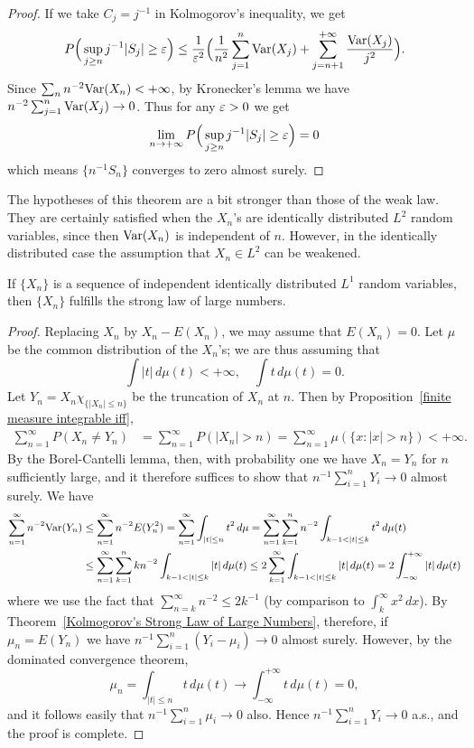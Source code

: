 \begin{proof}
If we take $C_j=j^{-1}$ in Kolmogorov's inequality, we get
\[P\Big(\sup_{j\geq n}j^{-1}|S_j|\geq\varepsilon\Big)\leq\frac{1}{\varepsilon^2}\Big(\frac{1}{n^2}\sum_{j=1}^{n}\mathrm{Var}(X_j)+\sum_{j=n+1}^{+\infty}\frac{\mathrm{Var}(X_j)}{j^2}\Big).\]
Since $\sum_nn^{-2}\mathrm{Var}(X_n)<+\infty$, by Kronecker's lemma we have $n^{-2}\sum_{j=1}^{n}\mathrm{Var}(X_j)\to 0$. Thus for any $\varepsilon>0$ we get
\[\lim_{n\to+\infty}P\Big(\sup_{j\geq n}j^{-1}|S_j|\geq\varepsilon\Big)=0\]
which means $\{n^{-1}S_n\}$ converges to zero almost surely.
\end{proof}
The hypotheses of this theorem are a bit stronger than those of the weak law. They are certainly satisfied when the $X_n$'s are identically distributed $L^2$ random variables, since then $\mathrm{Var}(X_n)$ is independent of $n$. However, in the identically distributed case the assumption that $X_n\in L^2$ can be weakened.
\begin{theorem}
If $\{X_n\}$ is a sequence of independent identically distributed $L^1$ random variables, then $\{X_n\}$ fulfills the strong law of large numbers.
\end{theorem}
\begin{proof}
Replacing $X_n$ by $X_n-E(X_n)$, we may assume that $E(X_n)=0$. Let $\mu$ be the common distribution of the $X_n$'s; we are thus assuming that
\[\int|t|\,d\mu(t)<+\infty,\quad\int t\,d\mu(t)=0.\]
Let $Y_n=X_n\chi_{\{|X_n|\leq n\}}$ be the truncation of $X_n$ at $n$. Then by Proposition~\ref{finite measure integrable iff},
\begin{align*}
\sum_{n=1}^{\infty}P(X_n\neq Y_n)&=\sum_{n=1}^{\infty}P(|X_n|>n)=\sum_{n=1}^{\infty}\mu(\{x:|x|>n\})<+\infty.
\end{align*}
By the Borel-Cantelli lemma, then, with probability one we have $X_n=Y_n$ for $n$ sufficiently large, and it therefore suffices to show that $n^{-1}\sum_{i=1}^{n}Y_i\to 0$ almost surely. We have
\begin{equation*}\small
\begin{aligned}
\sum_{n=1}^{\infty}n^{-2}\Var(Y_n)&\leq\sum_{n=1}^{\infty}n^{-2}E(Y_n^2)=\sum_{n=1}^{\infty}\int_{|t|\leq n}t^2\,d\mu=\sum_{n=1}^{\infty}\sum_{k=1}^{n}n^{-2}\int_{k-1<|t|\leq k}t^2\,d\mu(t)\\
&\leq\sum_{n=1}^{\infty}\sum_{k=1}^{n}kn^{-2}\int_{k-1<|t|\leq k}|t|\,d\mu(t)\leq 2\sum_{k=1}^{\infty}\int_{k-1<|t|\leq k}|t|\,d\mu(t)=2\int_{-\infty}^{+\infty}|t|\,d\mu(t)
\end{aligned}
\end{equation*}
where we use the fact that $\sum_{n=k}^{\infty}n^{-2}\leq 2k^{-1}$ (by comparison to $\int_{k}^{\infty}x^2\,dx$). By Theorem~\ref{Kolmogorov's Strong Law of Large Numbers}, therefore, if $\mu_n=E(Y_n)$ we have $n^{-1}\sum_{i=1}^{n}(Y_i-\mu_i)\to 0$ almost surely. However, by the dominated convergence theorem,
\[\mu_n=\int_{|t|\leq n}t\,d\mu(t)\to\int_{-\infty}^{+\infty}t\,d\mu(t)=0,\]
and it follows easily that $n^{-1}\sum_{i=1}^{n}\mu_i\to 0$ also. Hence $n^{-1}\sum_{i=1}^{n}Y_i\to 0$ a.s., and the proof is complete.
\end{proof}
